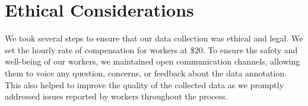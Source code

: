 \section{Ethical Considerations}
We took several steps to ensure that our data collection was ethical and legal. We set the hourly rate of compensation for workers at \$20.
To ensure the safety and well-being of our workers, we maintained open communication channels, allowing them to voice any question, concerns, or feedback about the data annotation.
This also helped to improve the quality of the collected data as we promptly addressed issues reported by workers throughout the process.
